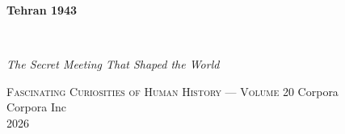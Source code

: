 \clearpage
\vspace*{1.5in}
\begin{center}
  \begin{minipage}{\textwidth}
    \centering
    \Huge\bfseries
    \linespread{1.25}\selectfont
    Tehran 1943
  \end{minipage}
  \\[3em]
  {\Large\itshape\linespread{1.3}\selectfont
  The Secret Meeting That Shaped the World\par}
  \vspace{2em}
  {\small\scshape Fascinating Curiosities of Human History — Volume 20}
  \vfill
  {\large Corpora}
  \\[1em]
  {\large Corpora Inc}
  \\[1em]
  {\large 2026}
\end{center}
\clearpage
